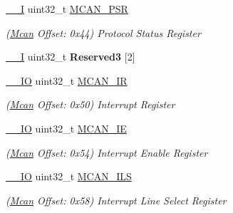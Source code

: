 \begin{DoxyCompactItemize}
\mbox{\label{structMcan_ab2c9a6a2337f1dee91970172832074af}} 
\mbox{\hyperlink{core__cm7_8h_af63697ed9952cc71e1225efe205f6cd3}{\+\_\+\+\_\+I}} uint32\+\_\+t \mbox{\hyperlink{structMcan_ab2c9a6a2337f1dee91970172832074af}{M\+C\+A\+N\+\_\+\+P\+SR}}
\begin{DoxyCompactList}\small\item\em (\mbox{\hyperlink{structMcan}{Mcan}} Offset\+: 0x44) Protocol Status Register \end{DoxyCompactList}\item 
\mbox{\label{structMcan_af7a3598ada1bd4068d032b68b33ecefc}} 
\mbox{\hyperlink{core__cm7_8h_af63697ed9952cc71e1225efe205f6cd3}{\+\_\+\+\_\+I}} uint32\+\_\+t {\bfseries Reserved3} \mbox{[}2\mbox{]}
\item 
\mbox{\label{structMcan_a9de6ff1b23c4701e40d014842314c0c5}} 
\mbox{\hyperlink{core__cm7_8h_aec43007d9998a0a0e01faede4133d6be}{\+\_\+\+\_\+\+IO}} uint32\+\_\+t \mbox{\hyperlink{structMcan_a9de6ff1b23c4701e40d014842314c0c5}{M\+C\+A\+N\+\_\+\+IR}}
\begin{DoxyCompactList}\small\item\em (\mbox{\hyperlink{structMcan}{Mcan}} Offset\+: 0x50) Interrupt Register \end{DoxyCompactList}\item 
\mbox{\label{structMcan_a0a9c472a93e5cd5c9f237d9a94ef7f2e}} 
\mbox{\hyperlink{core__cm7_8h_aec43007d9998a0a0e01faede4133d6be}{\+\_\+\+\_\+\+IO}} uint32\+\_\+t \mbox{\hyperlink{structMcan_a0a9c472a93e5cd5c9f237d9a94ef7f2e}{M\+C\+A\+N\+\_\+\+IE}}
\begin{DoxyCompactList}\small\item\em (\mbox{\hyperlink{structMcan}{Mcan}} Offset\+: 0x54) Interrupt Enable Register \end{DoxyCompactList}\item 
\mbox{\label{structMcan_a2308731a54a1ea8e24de22d5e5f0d728}} 
\mbox{\hyperlink{core__cm7_8h_aec43007d9998a0a0e01faede4133d6be}{\+\_\+\+\_\+\+IO}} uint32\+\_\+t \mbox{\hyperlink{structMcan_a2308731a54a1ea8e24de22d5e5f0d728}{M\+C\+A\+N\+\_\+\+I\+LS}}
\begin{DoxyCompactList}\small\item\em (\mbox{\hyperlink{structMcan}{Mcan}} Offset\+: 0x58) Interrupt Line Select Register \end{DoxyCompactList}\item 

\end{DoxyCompactItemize}
